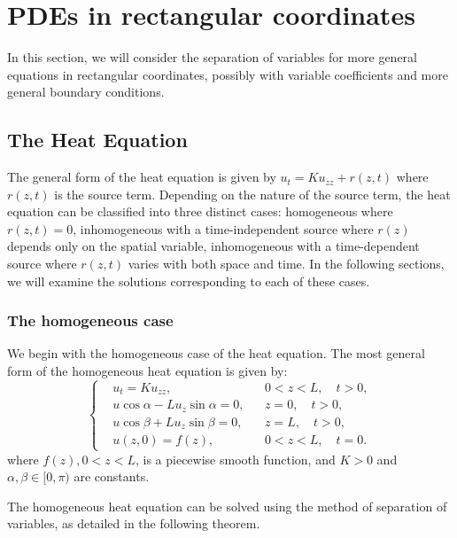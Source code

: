\section{PDEs in rectangular coordinates}

In this section, we will consider the separation of variables for more general equations in rectangular coordinates, possibly with variable coefficients and more general boundary conditions. 

\subsection{The Heat Equation}

The general form of the heat equation is given by $u_t = K u_{zz} + r(z, t)$ where $r(z, t)$ is the source term. Depending on the nature of the source term, the heat equation can be classified into three distinct cases: homogeneous where $r(z, t) = 0$, inhomogeneous with a time-independent source where $r(z)$ depends only on the spatial variable, inhomogeneous with a time-dependent source where $r(z, t)$ varies with both space and time. In the following sections, we will examine the solutions corresponding to each of these cases.


\subsubsection{The homogeneous case} We begin with the homogeneous case of the heat equation. The most general form of the homogeneous heat equation is given by:
\begin{equation}\label{eq.homogeneous_heat_general}
    \left\{
    \begin{aligned} 
        &u_t = K u_{zz}, && 0 < z < L, \quad t > 0, \\
        &u \cos \alpha - L u_z \sin \alpha = 0, && z = 0, \quad t > 0, \\
        &u \cos \beta + L u_z \sin \beta = 0, && z = L, \quad t > 0, \\
        &u(z, 0) = f(z), && 0 < z < L, \quad t = 0.
    \end{aligned}
    \right.
\end{equation}
where $f(z), 0<z<L$, is a piecewise smooth function, and $K>0$ and $\alpha, \beta \in[0, \pi)$ are constants.

The homogeneous heat equation can be solved using the method of separation of variables, as detailed in the following theorem.

